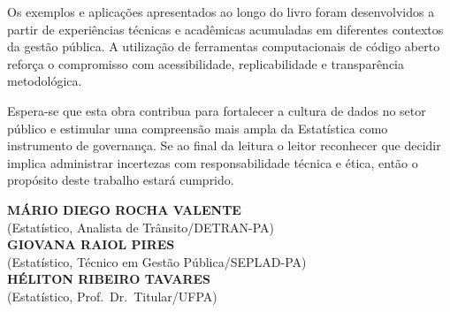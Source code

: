 \newpage
Os exemplos e aplicações apresentados ao longo do livro foram desenvolvidos a partir de experiências técnicas e acadêmicas acumuladas em diferentes contextos da gestão pública. A utilização de ferramentas computacionais de código aberto reforça o compromisso com acessibilidade, replicabilidade e transparência metodológica. \vskip0.3cm

Espera-se que esta obra contribua para fortalecer a cultura de dados no setor público e estimular uma compreensão mais ampla da Estatística como instrumento de governança. Se ao final da leitura o leitor reconhecer que decidir implica administrar incertezas com responsabilidade técnica e ética, então o propósito deste trabalho estará cumprido.

\vskip1cm
\begin{centering}

\textbf{MÁRIO DIEGO ROCHA VALENTE} \\
(Estatístico, Analista de Trânsito/DETRAN-PA) \\

\vskip0.7cm
\textbf{GIOVANA RAIOL PIRES} \\
(Estatístico, Técnico em Gestão Pública/SEPLAD-PA) \\

\vskip0.7cm
\textbf{HÉLITON RIBEIRO TAVARES} \\
(Estatístico, Prof.\ Dr.\ Titular/UFPA) \\

\end{centering}





